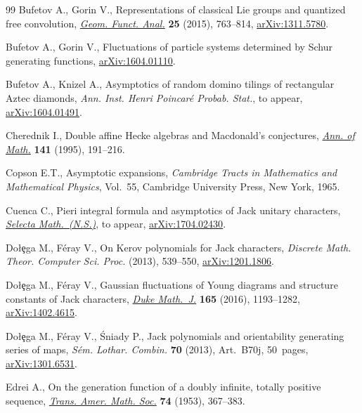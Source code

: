 \documentclass[pdftex]{sigma}
\numberwithin{equation}{section}
\begin{document}
\begin{thebibliography}{99}
Bufetov A., Gorin V., Representations of classical {L}ie groups and quantized
 free convolution, \href{https://doi.org/10.1007/s00039-015-0323-x}{\textit{Geom. Funct. Anal.}} \textbf{25} (2015), 763--814,
 \href{https://arxiv.org/abs/1311.5780}{arXiv:1311.5780}.

Bufetov A., Gorin V., Fluctuations of particle systems determined by {S}chur
 generating functions, \href{https://arxiv.org/abs/1604.01110}{arXiv:1604.01110}.

Bufetov A., Knizel A., Asymptotics of random domino tilings of rectangular
 Aztec diamonds, \textit{Ann. Inst. Henri Poincar\'e Probab. Stat.}, {t}o
 appear, \href{https://arxiv.org/abs/1604.01491}{arXiv:1604.01491}.

Cherednik I., Double af\/f\/ine {H}ecke algebras and {M}acdonald's conjectures,
 \href{https://doi.org/10.2307/2118632}{\textit{Ann. of Math.}} \textbf{141} (1995), 191--216.

Copson E.T., Asymptotic expansions, \textit{Cambridge Tracts in Mathematics and
 Mathematical Physics}, Vol.~55, Cambridge University Press, New York, 1965.

Cuenca C., Pieri integral formula and asymptotics of {J}ack unitary characters,
 \href{https://doi.org/10.1007/s00029-017-0373-z}{\textit{Selecta Math.~(N.S.)}}, {t}o appear, \href{https://arxiv.org/abs/1704.02430}{arXiv:1704.02430}.

Do{\l}\c{e}ga M., F\'eray V., On {K}erov polynomials for {J}ack characters,
 \textit{Discrete Math. Theor. Computer Sci. Proc.} (2013), 539--550,
 \href{https://arxiv.org/abs/1201.1806}{arXiv:1201.1806}.

Do{\l}\c{e}ga M., F\'eray V., Gaussian f\/luctuations of {Y}oung diagrams and
 structure constants of {J}ack characters, \href{https://doi.org/10.1215/00127094-3449566}{\textit{Duke Math.~J.}} \textbf{165}
 (2016), 1193--1282, \href{https://arxiv.org/abs/1402.4615}{arXiv:1402.4615}.

Do{\l}\c{e}ga M., F\'eray V., \'Sniady P., Jack polynomials and orientability
 generating series of maps, \textit{S\'em. Lothar. Combin.} \textbf{70}
 (2013), Art.~B70j, 50~pages, \href{https://arxiv.org/abs/1301.6531}{arXiv:1301.6531}.

Edrei A., On the generation function of a doubly inf\/inite, totally positive
 sequence, \href{https://doi.org/10.2307/1990808}{\textit{Trans. Amer. Math. Soc.}} \textbf{74} (1953), 367--383.


\end{thebibliography}
\end{document}

